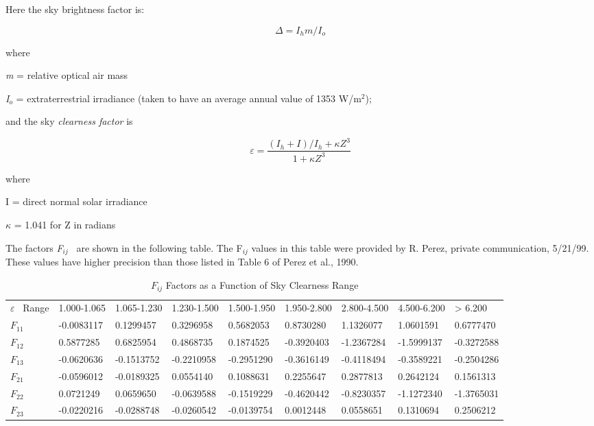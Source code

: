 Here the sky brightness factor is:

\begin{equation}
\Delta  = {I_h}m/{I_o}
\end{equation}

where

\emph{m} = relative optical air mass

\emph{I\(_{o}\)} = extraterrestrial irradiance (taken to have an average annual value of 1353 W/m\(^{2}\));

and the sky \emph{clearness factor} is

\begin{equation}
\varepsilon  = \frac{{({I_h} + I)/{I_h} + \kappa {Z^3}}}{{1 + \kappa {Z^3}}}
\end{equation}

where

I = direct normal solar irradiance

$\kappa$ = 1.041 for Z in radians

The factors \emph{F\(_{ij}\)} ~are shown in the following table. The F\(_{ij}\) values in this table were provided by R. Perez, private communication, 5/21/99. These values have higher precision than those listed in Table 6 of Perez et al., 1990.

{\scriptsize
\begin{longtable}[c]{p{0.4in}p{0.6in}p{0.6in}p{0.6in}p{0.6in}p{0.6in}p{0.6in}p{0.6in}p{0.6in}}

\caption{$F_{ij}$ Factors as a Function of Sky Clearness Range \label{table:fij-factors-as-a-function-of-sky-clearness}} \tabularnewline
\toprule
\endfirsthead

\caption[]{$F_{ij}$ Factors as a Function of Sky Clearness Range} \tabularnewline
\toprule
\endhead

$\varepsilon$~ Range & 1.000-1.065 & 1.065-1.230 & 1.230-1.500 & 1.500-1.950 & 1.950-2.800 & 2.800-4.500 & 4.500-6.200 & >  6.200 \tabularnewline \midrule
$F_{11}$ & -0.0083117 & 0.1299457 & 0.3296958 & 0.5682053 & 0.8730280 & 1.1326077 & 1.0601591 & 0.6777470 \tabularnewline \midrule
$F_{12}$ & 0.5877285 & 0.6825954 & 0.4868735 & 0.1874525 & -0.3920403 & -1.2367284 & -1.5999137 & -0.3272588 \tabularnewline \midrule
$F_{13}$ & -0.0620636 & -0.1513752 & -0.2210958 & -0.2951290 & -0.3616149 & -0.4118494 & -0.3589221 & -0.2504286 \tabularnewline \midrule
$F_{21}$ & -0.0596012 & -0.0189325 & 0.0554140 & 0.1088631 & 0.2255647 & 0.2877813 & 0.2642124 & 0.1561313 \tabularnewline \midrule
$F_{22}$ & 0.0721249 & 0.0659650 & -0.0639588 & -0.1519229 & -0.4620442 & -0.8230357 & -1.1272340 & -1.3765031 \tabularnewline \midrule
$F_{23}$ & -0.0220216 & -0.0288748 & -0.0260542 & -0.0139754 & 0.0012448 & 0.0558651 & 0.1310694 & 0.2506212 \tabularnewline \midrule
\bottomrule
\end{longtable}}

